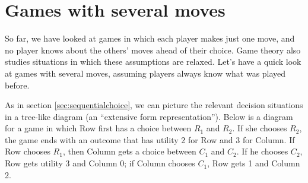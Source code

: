 \section{Games with several moves}\label{sec:sequentialgames}

So far, we have looked at games in which each player makes just one move, and
no player knows about the others' moves ahead of their choice. Game theory also
studies situations in which these assumptions are relaxed. Let's have a quick
look at games with several moves, assuming players always know what was played
before.

As in section \ref{sec:sequentialchoice}, we can picture the relevant decision
situations in a tree-like diagram (an ``extensive form representation''). Below
is a diagram for a game in which Row first has a choice between $R_1$ and $R_2$.
If she chooses $R_2$, the game ends with an outcome that has utility 2
for Row and 3 for Column. If Row chooses $R_1$, then Column gets a choice
between $C_1$ and $C_2$. If he chooses $C_2$, Row gets utility 3 and Column 0;
if Column chooses $C_1$, Row gets 1 and Column 2.

\begin{center}
\end{center}



